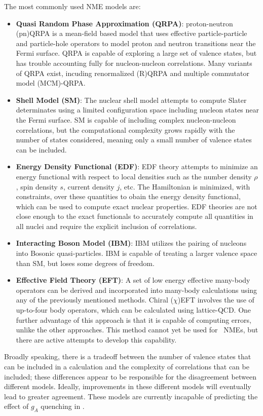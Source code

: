 \documentclass[/main.tex]{subfiles}
\begin{document}
The most commonly used NME models are:
\begin{itemize}
\item \textbf{Quasi Random Phase Approximation (QRPA)}: proton-neutron (pn)QRPA is a mean-field based model that uses effective particle-particle and particle-hole operators to model proton and neutron transitions near the Fermi surface.
  QRPA is capable of exploring a large set of valence states, but has trouble accounting fully for nucleon-nucleon correlations.
  Many variants of QRPA exist, incuding renormalized (R)QRPA and multiple commutator model (MCM)-QRPA.
\item \textbf{Shell Model (SM)}: The nuclear shell model attempts to compute Slater determinates using a limited configuration space including nucleon states near the Fermi surface.
  SM is capable of including complex nucleon-nucleon correlations, but the computational complexity grows rapidly with the number of states considered, meaning only a small number of valence states can be included.
\item \textbf{Energy Density Functional (EDF)}: EDF theory attempts to minimize an energy functional with respect to local densities such as the number density $\rho$, spin density $s$, current density $j$, etc.
  The Hamiltonian is minimized, with constraints, over these quantities to obain the energy density functional, which can be used to compute exact nuclear properties.
  EDF theories are not close enough to the exact functionals to accurately compute all quantities in all nuclei and require the explicit inclusion of correlations.
\item \textbf{Interacting Boson Model (IBM)}: IBM utilizes the pairing of nucleons into Bosonic quasi-particles.
  IBM is capable of treating a larger valence space than SM, but loses some degrees of freedom.
\item \textbf{Effective Field Theory (EFT)}: A set of low energy effective many-body operators can be derived and incorporated into many-body calculations using any of the previously mentioned methods.
  Chiral ($\chi$)EFT involves the use of up-to-four body operators, which can be calculated using lattice-QCD.
  One further advantage of this approach is that it is capable of computing errors, unlike the other approaches.
  This method cannot yet be used for \znbb\ NMEs, but there are active attempts to develop this capability.
\end{itemize}
Broadly speaking, there is a tradeoff between the number of valence states that can be included in a calculation and the complexity of correlations that can be included; these differences appear to be responsible for the disagreement between different models.
Ideally, improvements in these different models will eventually lead to greater agreement.
These models are currently incapable of predicting the effect of $g_A$ quenching in \znbb.
\end{document}
